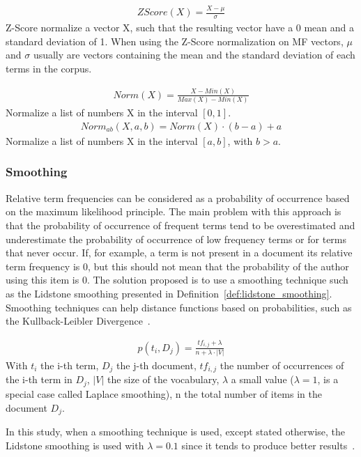 \begin{definition}
  \label{def:z_score}
  \begin{gather*}
    ZScore(X) = \frac{X - \mu}{\sigma}
  \end{gather*}
  Z-Score normalize a vector X, such that the resulting vector have a 0 mean and a standard deviation of 1.
  When using the Z-Score normalization on MF vectors, $\mu$ and $\sigma$ usually are vectors containing the mean and the standard deviation of each terms in the corpus.
\end{definition}

\begin{definition}
  \label{def:normalization}
  \begin{gather*}
    Norm(X) = \frac{X - Min(X)}{Max(X) - Min(X)}
  \end{gather*}
  Normalize a list of numbers X in the interval $[0, 1]$.
  \begin{gather*}
    Norm_{ab}(X, a, b) = Norm(X) \cdot (b - a) + a
  \end{gather*}
  Normalize a list of numbers X in the interval $[a, b]$, with $b > a$.
\end{definition}

\subsubsection{Smoothing}

Relative term frequencies can be considered as a probability of occurrence based on the maximum likelihood principle.
The main problem with this approach is that the probability of occurrence of frequent terms tend to be overestimated and underestimate the probability of occurrence of low frequency terms or for terms that never occur.
If, for example, a term is not present in a document its relative term frequency is 0, but this should not mean that the probability of the author using this item is 0.
The solution proposed is to use a smoothing technique such as the Lidstone smoothing presented in Definition~\ref{def:lidstone_smoothing}.
Smoothing techniques can help distance functions based on probabilities, such as the Kullback-Leibler Divergence~\cite{savoy_stylo}.

\begin{definition}
  \label{def:lidstone_smoothing}
  \begin{gather*}
    p(t_i, D_j) = \frac{tf_{i,j} + \lambda}{n + \lambda \cdot |V|}
  \end{gather*}
  With $t_i$ the i-th term, $D_j$ the j-th document, $tf_{i,j}$ the number of occurrences of the i-th term in $D_j$, $|V|$ the size of the vocabulary, $\lambda$ a small value ($\lambda = 1$, is a special case called Laplace smoothing), n the total number of items in the document $D_j$.
\end{definition}

In this study, when a smoothing technique is used, except stated otherwise, the Lidstone smoothing is used with $\lambda = 0.1$ since it tends to produce better results~\cite{savoy_stylo}.
